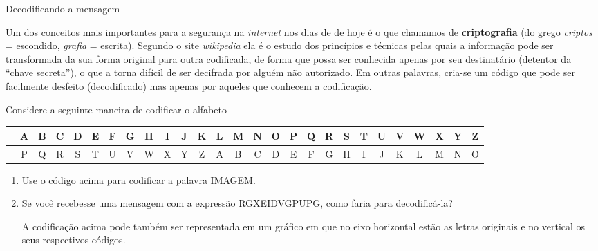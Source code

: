 \documentclass[extrafontsizes, twoside, 11pt, openright, final]{memoir}
\begin{document}
\begin{task}{ Decodificando a mensagem}
	\label{\detokenize{AF106-A:atividade-decodificando-a-mensagem}}\label{\detokenize{AF106-A:ativ-decodificando}}

	Um dos conceitos mais importantes para a segurança na \emph{internet} nos dias de de hoje é o que chamamos de \textbf{criptografia} (do grego \emph{criptos} = escondido, \emph{grafia} = escrita). Segundo o site \emph{wikipedia} ela é o estudo dos princípios e técnicas pelas quais a informação pode ser transformada da sua forma original para outra codificada, de forma que possa ser conhecida apenas por seu destinatário (detentor da “chave secreta”), o que a torna difícil de ser decifrada por alguém não autorizado. Em outras palavras, cria-se um código que pode ser facilmente desfeito (decodificado) mas apenas por aqueles que conhecem a codificação.

	Considere a seguinte maneira de codificar o alfabeto

	\begin{table}[H]
		\centering
		\setlength\tabcolsep{3pt}
		\begin{tabular}{|c|c|c|c|c|c|c|c|c|c|c|c|c|c|c|c|c|c|c|c|c|c|c|c|c|c|c|}
			\hline
			\hline
			\cellcolor{\tikzcolor}{\textcolor{white}{\textbf{Original}}} & A & B & C & D & E & F & G & H & I & J & K & L & M & N & O & P & Q & R & S & T & U & V & W & X & Y & Z \\
			\hline
			\cellcolor{\tikzcolor}{\textcolor{white}{\textbf{Código}}}   & P & Q & R & S & T & U & V & W & X & Y & Z & A & B & C & D & E & F & G & H & I & J & K & L & M & N & O \\
			\hline
		\end{tabular}
	\end{table}

	\begin{enumerate}
		\item Use o código acima para codificar a palavra IMAGEM.

		\item Se você recebesse uma mensagem com a expressão RGXEIDVGPUPG, como faria para decodificá-la?

		      A codificação acima pode também ser representada em um gráfico em que no eixo horizontal estão as letras originais e no vertical os seus respectivos códigos.

		      \begin{figure}[H]
			      \begin{center}
				      \centering


\end{center}
\end{figure}
\end{enumerate}
\end{task}
\end{document}

